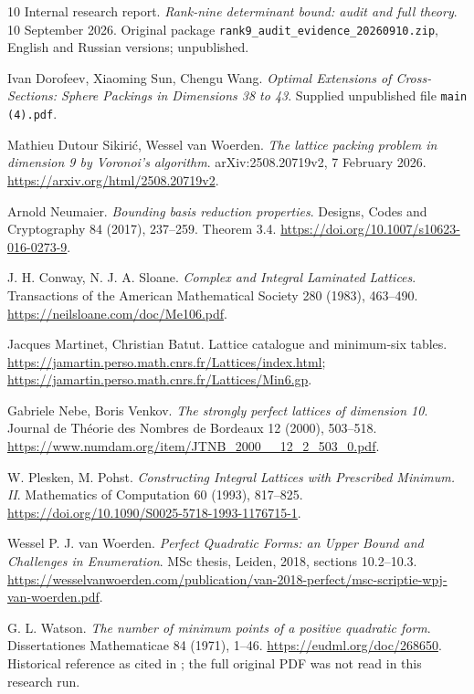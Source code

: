 \documentclass[11pt,a4paper]{article}
\theoremstyle{remark}\newtheorem{remark}[theorem]{Remark}
\newcommand{\file}[1]{{\small\nolinkurl{#1}}}
\begin{document}
\clearpage
\begin{thebibliography}{10}
Internal research report. \emph{Rank-nine determinant bound: audit and full theory}. 10 September 2026. Original package \file{rank9_audit_evidence_20260910.zip}, English and Russian versions; unpublished.

Ivan Dorofeev, Xiaoming Sun, Chengu Wang.
\emph{Optimal Extensions of Cross-Sections: Sphere Packings in Dimensions 38 to 43}.
Supplied unpublished file \file{main (4).pdf}.

Mathieu Dutour Sikirić, Wessel van Woerden.
\emph{The lattice packing problem in dimension 9 by Voronoi's algorithm}.
arXiv:2508.20719v2, 7 February 2026.
\url{https://arxiv.org/html/2508.20719v2}.

Arnold Neumaier.
\emph{Bounding basis reduction properties}.
Designs, Codes and Cryptography 84 (2017), 237--259.
Theorem 3.4.
\url{https://doi.org/10.1007/s10623-016-0273-9}.

J. H. Conway, N. J. A. Sloane.
\emph{Complex and Integral Laminated Lattices}.
Transactions of the American Mathematical Society 280 (1983), 463--490.
\url{https://neilsloane.com/doc/Me106.pdf}.

Jacques Martinet, Christian Batut. Lattice catalogue and minimum-six tables.
\url{https://jamartin.perso.math.cnrs.fr/Lattices/index.html};
\url{https://jamartin.perso.math.cnrs.fr/Lattices/Min6.gp}.

Gabriele Nebe, Boris Venkov.
\emph{The strongly perfect lattices of dimension 10}.
Journal de Théorie des Nombres de Bordeaux 12 (2000), 503--518.
\url{https://www.numdam.org/item/JTNB_2000__12_2_503_0.pdf}.

W. Plesken, M. Pohst.
\emph{Constructing Integral Lattices with Prescribed Minimum. II}.
Mathematics of Computation 60 (1993), 817--825.
\url{https://doi.org/10.1090/S0025-5718-1993-1176715-1}.

Wessel P. J. van Woerden.
\emph{Perfect Quadratic Forms: an Upper Bound and Challenges in Enumeration}.
MSc thesis, Leiden, 2018, sections 10.2--10.3.
\url{https://wesselvanwoerden.com/publication/van-2018-perfect/msc-scriptie-wpj-van-woerden.pdf}.

G. L. Watson. \emph{The number of minimum points of a positive quadratic form}.
Dissertationes Mathematicae 84 (1971), 1--46.
\url{https://eudml.org/doc/268650}.
Historical reference as cited in \cite{dw}; the full original PDF was not read in this research run.
\end{thebibliography}
\end{document}
